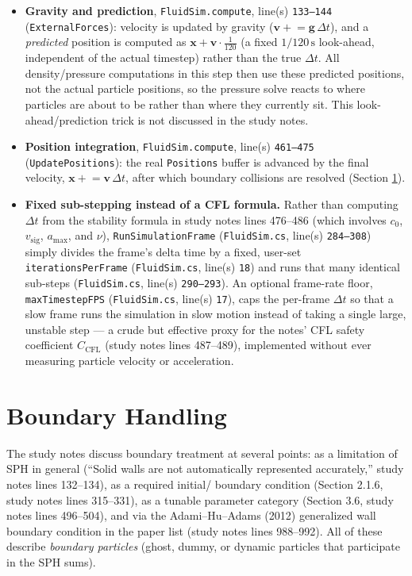 \documentclass[11pt]{article}
\newcommand{\loc}[2]{\texttt{#1}, line(s) \texttt{#2}}
\begin{document}
\begin{itemize}
    \item \textbf{Gravity and prediction}, \loc{FluidSim.compute}{133--144}
    (\texttt{ExternalForces}): velocity is updated by gravity
    ($\mathbf{v} \mathrel{+}= \mathbf{g}\,\Delta t$), and a
    \emph{predicted} position is computed as $\mathbf{x} + \mathbf{v}\cdot
    \frac1{120}$ (a fixed $1/120\,\text{s}$ look-ahead, independent of the
    actual timestep) rather than the true $\Delta t$. All density/pressure
    computations in this step then use these predicted positions, not the
    actual particle positions, so the pressure solve reacts to where
    particles are about to be rather than where they currently sit. This
    look-ahead/prediction trick is not discussed in the study notes.
    \item \textbf{Position integration}, \loc{FluidSim.compute}{461--475}
    (\texttt{UpdatePositions}): the real \texttt{Positions} buffer is
    advanced by the final velocity, $\mathbf{x}\mathrel{+}=\mathbf{v}\,\Delta
    t$, after which boundary collisions are resolved (Section
    \ref{sec:boundary}).
    \item \textbf{Fixed sub-stepping instead of a CFL formula.} Rather than
    computing $\Delta t$ from the stability formula in study notes lines
    476--486 (which involves $c_0$, $v_{\text{sig}}$, $a_{\max}$, and $\nu$),
    \texttt{RunSimulationFrame} (\loc{FluidSim.cs}{284--308}) simply divides
    the frame's delta time by a fixed, user-set
    \texttt{iterationsPerFrame} (\loc{FluidSim.cs}{18}) and runs that many
    identical sub-steps (\loc{FluidSim.cs}{290--293}). An optional frame-rate
    floor, \texttt{maxTimestepFPS} (\loc{FluidSim.cs}{17}), caps the
    per-frame $\Delta t$ so that a slow frame runs the simulation in slow
    motion instead of taking a single large, unstable step --- a crude but
    effective proxy for the notes' CFL safety coefficient
    $C_{\text{CFL}}$ (study notes lines 487--489), implemented without ever
    measuring particle velocity or acceleration.
\end{itemize}

\section{Boundary Handling}
\label{sec:boundary}

The study notes discuss boundary treatment at several points: as a
limitation of SPH in general (``Solid walls are not automatically
represented accurately,'' study notes lines 132--134), as a required initial/
boundary condition (Section 2.1.6, study notes lines 315--331), as a tunable
parameter category (Section 3.6, study notes lines 496--504), and via the
Adami--Hu--Adams (2012) generalized wall boundary condition in the paper list
(study notes lines 988--992). All of these describe \emph{boundary
particles} (ghost, dummy, or dynamic particles that participate in the SPH
sums).
\end{document}
